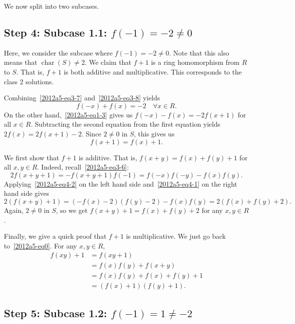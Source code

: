 \documentclass{article}
\DeclareMathOperator{\rchar}{char}
\begin{document}
We now split into two subcases.









\subsection*{Step 4: Subcase 1.1: $f(-1) = -2 \neq 0$}

Here, we consider the subcase where $f(-1) = -2 \neq 0$.
Note that this also means that $\rchar(S) \neq 2$.
We claim that $f + 1$ is a ring homomorphism from $R$ to $S$.
That is, $f + 1$ is both additive and multiplicative.
This corresponds to the class 2 solutions.

Combining~\eqref{2012a5-eq3-7} and~\eqref{2012a5-eq3-8} yields
\[ f(-x) + f(x) = -2 \quad \forall x \in R. \tag{4.1}\label{2012a5-eq4-1} \]
On the other hand,~\eqref{2012a5-eq1-3} gives us $f(-x) - f(x) = -2 f(x + 1)$ for all $x \in R$.
Subtracting the second equation from the first equation yields $2 f(x) = 2 f(x + 1) - 2$.
Since $2 \neq 0$ in $S$, this gives us
\[ f(x + 1) = f(x) + 1. \tag{4.2}\label{2012a5-eq4-2} \]

We first show that $f + 1$ is additive.
That is, $f(x + y) = f(x) + f(y) + 1$ for all $x, y \in R$.
Indeed, recall~\eqref{2012a5-eq3-6}:
\[ 2 f(x + y + 1) = -f(x + y + 1) f(-1) = f(-x) f(-y) - f(x) f(y). \]
Applying~\eqref{2012a5-eq4-2} on the left hand side and~\eqref{2012a5-eq4-1} on the right hand side gives
\[ 2 (f(x + y) + 1) = (-f(x) - 2)(f(y) - 2) - f(x) f(y) = 2 (f(x) + f(y) + 2). \]
Again, $2 \neq 0$ in $S$, so we get $f(x + y) + 1 = f(x) + f(y) + 2$ for any $x, y \in R$.

Finally, we give a quick proof that $f + 1$ is multiplicative.
We just go back to~\eqref{2012a5-eq0}.
For any $x, y \in R$,
\begin{align*}
    f(xy) + 1
    &= f(xy + 1) \\
    &= f(x) f(y) + f(x + y) \\
    &= f(x) f(y) + f(x) + f(y) + 1 \\
    &= (f(x) + 1)(f(y) + 1).
\end{align*}









\subsection*{Step 5: Subcase 1.2: $f(-1) = 1 \neq -2$}
\end{document}
